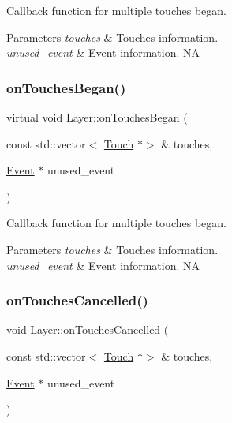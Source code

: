 Callback function for multiple touches began.


\begin{DoxyParams}{Parameters}
{\em touches} & Touches information. \\
\hline
{\em unused\+\_\+event} & \hyperlink{classEvent}{Event} information.  NA \\
\hline
\end{DoxyParams}
\mbox{\label{classLayer_aff1b8435f8f420498162153b0e71c70b}} 
\subsubsection{\texorpdfstring{on\+Touches\+Began()}{onTouchesBegan()}\hspace{0.1cm}{\footnotesize\ttfamily [2/2]}}
{\footnotesize\ttfamily virtual void Layer\+::on\+Touches\+Began (\begin{DoxyParamCaption}\item[{const std\+::vector$<$ \hyperlink{classTouch}{Touch} $\ast$$>$ \&}]{touches,  }\item[{\hyperlink{classEvent}{Event} $\ast$}]{unused\+\_\+event }\end{DoxyParamCaption})\hspace{0.3cm}{\ttfamily [virtual]}}

Callback function for multiple touches began.


\begin{DoxyParams}{Parameters}
{\em touches} & Touches information. \\
\hline
{\em unused\+\_\+event} & \hyperlink{classEvent}{Event} information.  NA \\
\hline
\end{DoxyParams}
\mbox{\label{classLayer_af5ebddb9ced172ccbd60b82330448b2f}} 
\subsubsection{\texorpdfstring{on\+Touches\+Cancelled()}{onTouchesCancelled()}\hspace{0.1cm}{\footnotesize\ttfamily [1/2]}}
{\footnotesize\ttfamily void Layer\+::on\+Touches\+Cancelled (\begin{DoxyParamCaption}\item[{const std\+::vector$<$ \hyperlink{classTouch}{Touch} $\ast$$>$ \&}]{touches,  }\item[{\hyperlink{classEvent}{Event} $\ast$}]{unused\+\_\+event }\end{DoxyParamCaption})\hspace{0.3cm}{\ttfamily [virtual]}}

